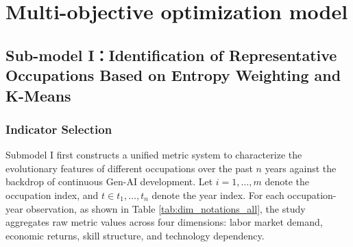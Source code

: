 \documentclass{mcmthesis}
\begin{document}
\section{Multi-objective optimization model}
\subsection{Sub-model I：Identification of Representative Occupations Based on Entropy Weighting and K-Means}

\subsubsection{Indicator Selection}
Submodel I first constructs a unified metric system to characterize the evolutionary features of different occupations over the past $n$ years against the backdrop of continuous Gen-AI development. Let $i = 1, \dots, m$ denote the occupation index, and $t \in {t_1, \dots, t_n}$ denote the year index. For each occupation-year observation, as shown in Table \ref{tab:dim_notations_all}, the study aggregates raw metric values across four dimensions: labor market demand, economic returns, skill structure, and technology dependency.



\newcommand{\DimHeader}[1]{%
  \noalign{\vskip 2pt}
  \cdashline{1-3}
  \noalign{\vskip 6pt}
  \multicolumn{3}{c}{\textbf{\textit{#1}}} \\
  \noalign{\vskip 6pt}
  \cdashline{1-3}
  \noalign{\vskip 2pt}
}

\captionsetup[table]{skip=12pt}
\end{document}
